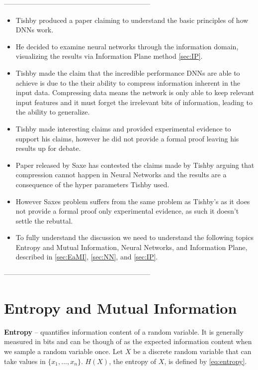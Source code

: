 \documentclass[dissertation.tex]{subfiles}
\begin{document}
---------------------------------------------------------------

\begin{itemize}
  \item{
      Tishby produced a paper \cite{TISHBY} claiming to understand the basic
      principles of how DNNs work. 
    }
  \item{
      He decided to examine neural networks through the information domain,
      visualizing the results via Information Plane method \autoref{sec:IP}.
    }
  \item{
      Tishby made the claim that the incredible performance DNNs are able to
      achieve is due to the their ability to compress information inherent in
      the input data. Compressing data means the network is only able to keep
      relevant input features and it must forget the irrelevant bits of
      information, leading to the ability to generalize.
    }
  \item{
      Tishby made interesting claims and provided experimental evidence to
      support his claims, however he did not provide a formal proof leaving his
      results up for debate.
    }
  \item{
      Paper released by Saxe has contested the claims made by Tishby arguing
      that compression cannot happen in Neural Networks and the results are a
      consequence of the hyper parameters Tishby used.     
    }
  \item{
      However Saxes problem suffers from the same problem as Tishby's as it does
      not provide a formal proof only experimental evidence, as such it doesn't
      settle the rebuttal.
    }
  \item{
      To fully understand the discussion we need to understand the following
      topics Entropy and Mutual Information, Neural Networks, and Information
      Plane, described in \autoref{sec:EaMI}, \autoref{sec:NN}, and
      \autoref{sec:IP}.
    }
\end{itemize}

---------------------------------------------------------------

\section{Entropy and Mutual Information}
\label{sec:EaMI}

\textbf{Entropy} -- quantifies information content of a random variable. It is
generally measured in bits and can be though of as the expected information
content when we sample a random variable once. Let $X$ be a discrete random
variable that can take values in $\{x_1,...,x_n\}$. $H(X)$, the entropy of
$X$, is defined by \autoref{eq:entropy}.
\end{document}
